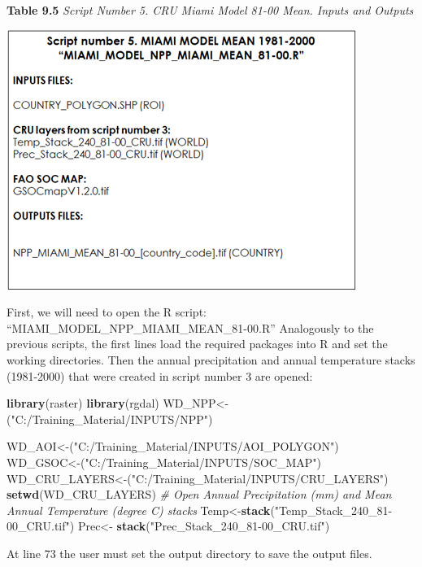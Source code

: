 \documentclass[
  10pt,
  b5paper,
]{book}
\newenvironment{Shaded}{\begin{snugshade}}{\end{snugshade}}
\newcommand{\CommentTok}[1]{\textcolor[rgb]{0.56,0.35,0.01}{\textit{#1}}}
\newcommand{\KeywordTok}[1]{\textcolor[rgb]{0.13,0.29,0.53}{\textbf{#1}}}
\newcommand{\NormalTok}[1]{#1}
\newcommand{\StringTok}[1]{\textcolor[rgb]{0.31,0.60,0.02}{#1}}
\begin{document}
\textbf{Table 9.5} \emph{Script Number 5. CRU Miami Model 81-00 Mean. Inputs and Outputs}

\includegraphics{tables/Table_9.4.png}

First, we will need to open the R script: ``MIAMI\_MODEL\_NPP\_MIAMI\_MEAN\_81-00.R''
Analogously to the previous scripts, the first lines load the required packages into R and set the working directories. Then the annual precipitation and annual temperature stacks (1981-2000) that were created in script number 3 are opened:

\begin{Shaded}
\begin{Highlighting}[]
\KeywordTok{library}\NormalTok{(raster)}
\KeywordTok{library}\NormalTok{(rgdal)}
\NormalTok{WD_NPP<-(}\StringTok{"C:/Training_Material/INPUTS/NPP"}\NormalTok{)}

\NormalTok{WD_AOI<-(}\StringTok{"C:/Training_Material/INPUTS/AOI_POLYGON"}\NormalTok{)}
\NormalTok{WD_GSOC<-(}\StringTok{"C:/Training_Material/INPUTS/SOC_MAP"}\NormalTok{)}
\NormalTok{WD_CRU_LAYERS<-(}\StringTok{"C:/Training_Material/INPUTS/CRU_LAYERS"}\NormalTok{)}
\KeywordTok{setwd}\NormalTok{(WD_CRU_LAYERS)}
\CommentTok{# Open Annual Precipitation (mm) and Mean Annual Temperature (degree C) stacks}
\NormalTok{Temp<-}\KeywordTok{stack}\NormalTok{(}\StringTok{"Temp_Stack_240_81-00_CRU.tif"}\NormalTok{)}
\NormalTok{Prec<-}\StringTok{ }\KeywordTok{stack}\NormalTok{(}\StringTok{"Prec_Stack_240_81-00_CRU.tif"}\NormalTok{)}
\end{Highlighting}
\end{Shaded}

At line 73 the user must set the output directory to save the output files.
\end{document}
